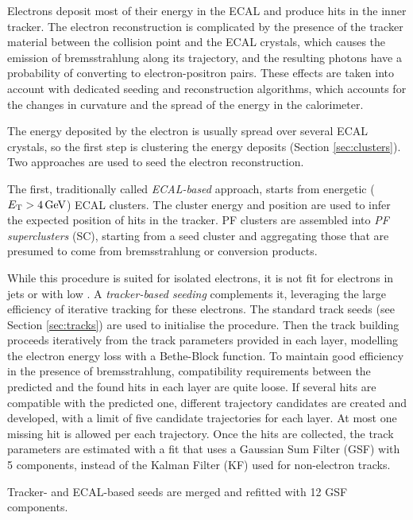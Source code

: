 \label{sec:eleReco}
Electrons deposit most of their energy in the ECAL and produce hits in the inner tracker.
The electron reconstruction is complicated by the presence of the tracker material between the collision point and the ECAL crystals,
which causes the emission of bremsstrahlung along its trajectory, and the resulting photons have a probability of converting to electron-positron pairs.
These effects are taken into account with dedicated seeding and reconstruction algorithms,
which accounts for the changes in curvature and the spread of the energy in the calorimeter.

The energy deposited by the electron is usually spread over several ECAL crystals, so the first step is clustering the energy deposits (Section \ref{sec:clusters}).
Two approaches are used to seed the electron reconstruction.

The first, traditionally called \textit{ECAL-based} approach, starts from energetic ($E_{\mathrm{T}} > 4\,\text{Ge\hspace{-.08em}V}$) ECAL clusters.
The cluster energy and position are used to infer the expected position of hits in the tracker.
PF clusters are assembled into \textit{PF superclusters} (SC), starting from a seed cluster and aggregating those that are presumed to come from bremsstrahlung or conversion products.

While this procedure is suited for isolated electrons, it is not fit for electrons in jets or with low \pt.
A \textit{tracker-based seeding} complements it, leveraging the large efficiency of iterative tracking for these electrons.
The standard track seeds (see Section \ref{sec:tracks}) are used to initialise the procedure.
Then the track building proceeds iteratively from the track parameters provided in each layer, modelling the electron energy loss with a Bethe-Block function.
To maintain good efficiency in the presence of bremsstrahlung, compatibility requirements between the predicted and the found hits in each layer are quite loose.
If several hits are compatible with the predicted one, different trajectory candidates are created and developed,
with a limit of five candidate trajectories for each layer.
At most one missing hit is allowed per each trajectory.
Once the hits are collected, the track parameters are estimated with a fit that uses a Gaussian Sum Filter (GSF) \cite{CMS-NOTE-2005-001} with 5 components,
instead of the Kalman Filter (KF) \cite{billoir.qian:simultaneous} used for non-electron tracks.

Tracker- and ECAL-based seeds are merged and refitted with 12 GSF components.

